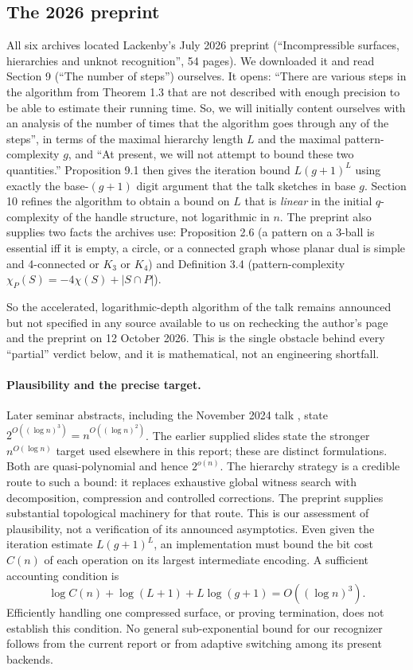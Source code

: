 \documentclass[11pt]{article}
\theoremstyle{remark}
\newcommand{\qp}{n^{O(\log n)}}
\begin{document}
\subsection{The 2026 preprint}
All six archives located Lackenby's July 2026 preprint \cite{lackenby2026}
(``Incompressible surfaces, hierarchies and unknot recognition'', 54 pages).
We downloaded it and read Section 9 (``The number of steps'') ourselves. It
opens: ``There are various steps in the algorithm from Theorem 1.3 that are
not described with enough precision to be able to estimate their running
time. So, we will initially content ourselves with an analysis of the number
of times that the algorithm goes through any of the steps'', in terms of the
maximal hierarchy length $L$ and the maximal pattern-complexity $g$, and ``At
present, we will not attempt to bound these two quantities.'' Proposition 9.1
then gives the iteration bound $L(g+1)^L$ using exactly the base-$(g+1)$
digit argument that the talk sketches in base $g$. Section 10 refines the
algorithm to obtain a bound on $L$ that is \emph{linear} in the initial
$q$-complexity of the handle structure, not logarithmic in $n$. The preprint
also supplies two facts the archives use: Proposition 2.6 (a pattern on a
3-ball is essential iff it is empty, a circle, or a connected graph whose
planar dual is simple and 4-connected or $K_3$ or $K_4$) and Definition 3.4
(pattern-complexity $\chi_P(S)=-4\chi(S)+|S\cap P|$).

So the accelerated, logarithmic-depth algorithm of the talk remains
announced but not specified in any source available to us on rechecking
the author's page and the preprint on 12 October 2026.
This is the single obstacle behind every ``partial'' verdict below, and it is
mathematical, not an engineering shortfall.

\paragraph{Plausibility and the precise target.}
Later seminar abstracts, including the November 2024 talk
\cite{lackenby2024-talk}, state
$2^{O((\log n)^3)}=n^{O((\log n)^2)}$.
The earlier supplied slides state the stronger $\qp$ target used elsewhere
in this report; these are distinct formulations. Both are quasi-polynomial and hence
$2^{o(n)}$.  The hierarchy strategy is a credible route to such a bound:
it replaces exhaustive global witness search with decomposition,
compression and controlled corrections.  The preprint supplies substantial
topological machinery for that route.  This is our assessment of plausibility,
not a verification of its announced asymptotics.
Even given the iteration estimate $L(g+1)^L$, an implementation must bound
the bit cost $C(n)$ of each operation on its largest intermediate encoding.
A sufficient accounting condition is
\[
 \log C(n)+\log(L+1)+L\log(g+1)=O((\log n)^3).
\]
Efficiently handling one compressed surface, or proving termination,
does not establish this condition.  No general sub-exponential bound for
our recognizer follows from the current report or from adaptive switching
among its present backends.
\end{document}
